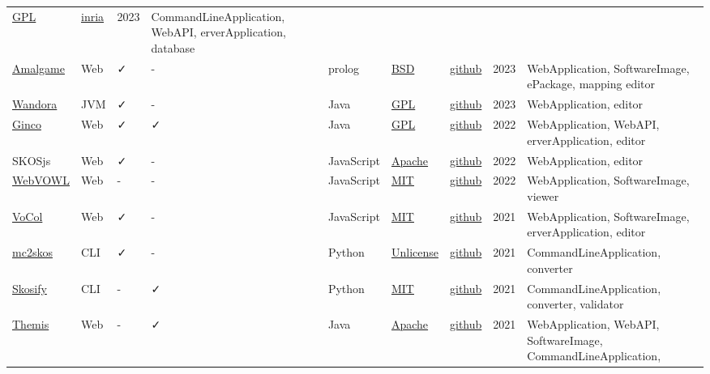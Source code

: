 \documentclass[
  DIV=10]{article}
\begin{document}
\begin{longtable}[]{@{}lllllllll@{}}
\href{https://spdx.org/licenses/GPL-3.0-or-later}{GPL} &
\href{https://gitlab.inria.fr/moex/alignapi/}{inria} & 2023 &
CommandLineApplication, WebAPI, erverApplication, database \\
\href{https://semanticweb.cs.vu.nl/amalgame/}{Amalgame} & Web & ✓ & - &
prolog & \href{https://spdx.org/licenses/BSD-3-Clause}{BSD} &
\href{https://github.com/jrvosse/amalgame}{github} & 2023 &
WebApplication, SoftwareImage, ePackage, mapping editor \\
\href{http://wandora.org/www/}{Wandora} & JVM & ✓ & - & Java &
\href{https://spdx.org/licenses/GPL-3.0-or-later}{GPL} &
\href{https://github.com/wandora-team/wandora}{github} & 2023 &
WebApplication, editor \\
\href{http://culturecommunication.github.io/ginco/}{Ginco} & Web & ✓ & ✓
& Java & \href{https://spdx.org/licenses/GPL-3.0-or-later}{GPL} &
\href{https://github.com/culturecommunication/ginco}{github} & 2022 &
WebApplication, WebAPI, erverApplication, editor \\
SKOSjs & Web & ✓ & - & JavaScript &
\href{https://spdx.org/licenses/Apache-2.0}{Apache} &
\href{https://github.com/tkurz/skosjs}{github} & 2022 & WebApplication,
editor \\
\href{https://service.tib.eu/webvowl/}{WebVOWL} & Web & - & - &
JavaScript & \href{https://spdx.org/licenses/MIT}{MIT} &
\href{https://github.com/VisualDataWeb/WebVOWL}{github} & 2022 &
WebApplication, SoftwareImage, viewer \\
\href{https://www.vocoreg.com/}{VoCol} & Web & ✓ & - & JavaScript &
\href{https://spdx.org/licenses/MIT}{MIT} &
\href{https://github.com/vocol/vocol}{github} & 2021 & WebApplication,
SoftwareImage, erverApplication, editor \\
\href{https://github.com/scriptotek/mc2skos}{mc2skos} & CLI & ✓ & - &
Python & \href{https://spdx.org/licenses/Unlicense}{Unlicense} &
\href{https://github.com/scriptotek/mc2skos}{github} & 2021 &
CommandLineApplication, converter \\
\href{https://skosify.readthedocs.io/en/latest/}{Skosify} & CLI & - & ✓
& Python & \href{https://spdx.org/licenses/MIT}{MIT} &
\href{https://github.com/NatLibFi/Skosify}{github} & 2021 &
CommandLineApplication, converter, validator \\
\href{http://themis.linkeddata.es/}{Themis} & Web & - & ✓ & Java &
\href{https://spdx.org/licenses/Apache-2.0}{Apache} &
\href{https://github.com/oeg-upm/Themis}{github} & 2021 &
WebApplication, WebAPI, SoftwareImage, CommandLineApplication,

\end{longtable}
\end{document}
